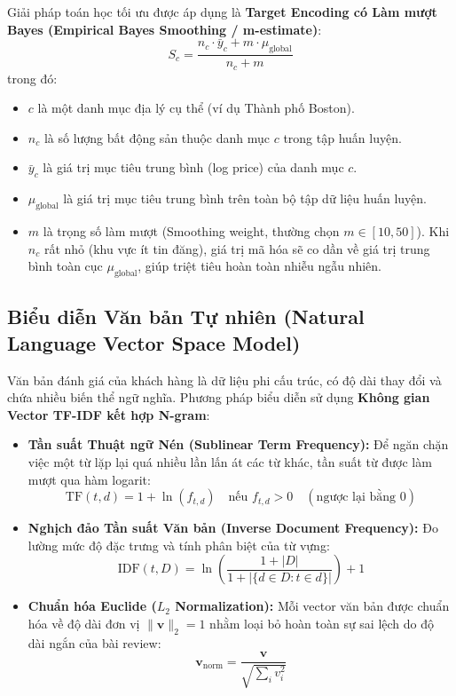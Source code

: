\documentclass[12pt,a4paper]{report}
\begin{document}
Giải pháp toán học tối ưu được áp dụng là \textbf{Target Encoding có Làm mượt Bayes (Empirical Bayes Smoothing / m-estimate)}:
\begin{equation}
S_c = \frac{n_c \cdot \bar{y}_c + m \cdot \mu_{\text{global}}}{n_c + m}
\label{eq:target_encoding}
\end{equation}
trong đó:
\begin{itemize}
    \item $c$ là một danh mục địa lý cụ thể (ví dụ Thành phố Boston).
    \item $n_c$ là số lượng bất động sản thuộc danh mục $c$ trong tập huấn luyện.
    \item $\bar{y}_c$ là giá trị mục tiêu trung bình (log price) của danh mục $c$.
    \item $\mu_{\text{global}}$ là giá trị mục tiêu trung bình trên toàn bộ tập dữ liệu huấn luyện.
    \item $m$ là trọng số làm mượt (Smoothing weight, thường chọn $m \in [10, 50]$). Khi $n_c$ rất nhỏ (khu vực ít tin đăng), giá trị mã hóa sẽ co dần về giá trị trung bình toàn cục $\mu_{\text{global}}$, giúp triệt tiêu hoàn toàn nhiễu ngẫu nhiên.
\end{itemize}

\subsection{Biểu diễn Văn bản Tự nhiên (Natural Language Vector Space Model)}
Văn bản đánh giá của khách hàng là dữ liệu phi cấu trúc, có độ dài thay đổi và chứa nhiều biến thể ngữ nghĩa. Phương pháp biểu diễn sử dụng \textbf{Không gian Vector TF-IDF kết hợp N-gram}:
\begin{itemize}[leftmargin=2em]
    \item \textbf{Tần suất Thuật ngữ Nén (Sublinear Term Frequency):} Để ngăn chặn việc một từ lặp lại quá nhiều lần lấn át các từ khác, tần suất từ được làm mượt qua hàm logarit:
    \begin{equation}
    \text{TF}(t, d) = 1 + \ln(f_{t, d}) \quad \text{nếu } f_{t, d} > 0 \quad (\text{ngược lại bằng } 0)
    \end{equation}
    \item \textbf{Nghịch đảo Tần suất Văn bản (Inverse Document Frequency):} Đo lường mức độ đặc trưng và tính phân biệt của từ vựng:
    \begin{equation}
    \text{IDF}(t, D) = \ln\left( \frac{1 + |D|}{1 + |\{d \in D : t \in d\}|} \right) + 1
    \end{equation}
    \item \textbf{Chuẩn hóa Euclide ($L_2$ Normalization):} Mỗi vector văn bản được chuẩn hóa về độ dài đơn vị $\|\mathbf{v}\|_2 = 1$ nhằm loại bỏ hoàn toàn sự sai lệch do độ dài ngắn của bài review:
    \begin{equation}
    \mathbf{v}_{\text{norm}} = \frac{\mathbf{v}}{\sqrt{\sum_{i} v_i^2}}
    \end{equation}
\end{itemize}
\end{document}
